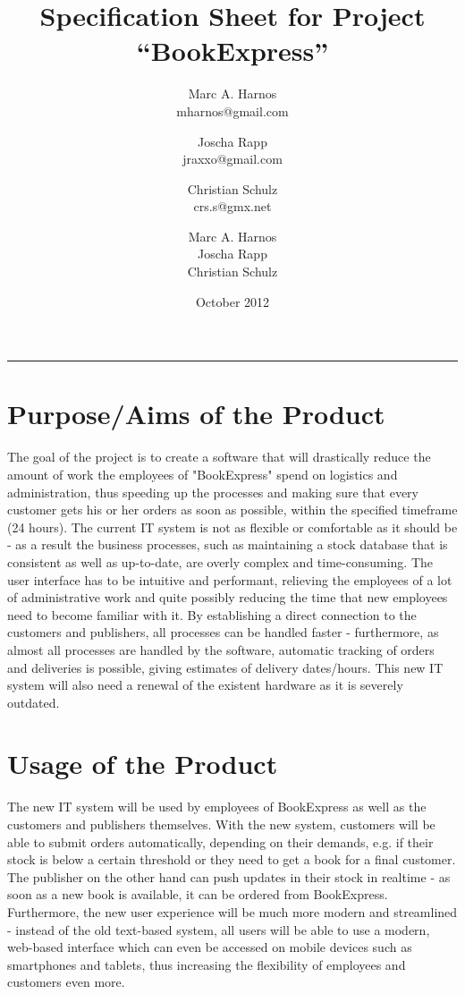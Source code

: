 \documentclass[11pt,a4paper,oneside,svgnames]{report}
\title{Specification Sheet for Project ``BookExpress''}
\author{Marc A. Harnos\\ {mharnos@gmail.com} \and Joscha Rapp\\ {jraxxo@gmail.com} \and Christian Schulz\\ {crs.s@gmx.net}}
\author{Marc A. Harnos\\ Joscha Rapp\\ Christian Schulz}
\date{October 2012}
\makeatletter
\renewcommand{\maketitle}{\begin{titlepage}%
    \let\footnotesize\small
    \let\footnoterule\relax
    \parindent \z@
    \reset@font
    \null\vfil
    \begin{flushleft}
      \huge \@title
    \end{flushleft}
    \par
    \hrule height 4pt
    \par
    \begin{flushright}
      \LARGE \@author \par
    \end{flushright}
    \vskip 60\p@
    \vfil\null
  \end{titlepage}%
  \setcounter{footnote}{0}%
}
\makeatother
\begin{document}
\maketitle
\clearpage
\tableofcontents
\clearpage

\chapter{Purpose/Aims of the Product}
The goal of the project is to create a software that will drastically reduce the amount of work the employees of "BookExpress" spend on logistics and administration, thus speeding up the processes and making sure that every customer gets his or her orders as soon as possible, within the specified timeframe (24 hours). The current IT system is not as flexible or comfortable as it should be - as a result the business processes, such as maintaining a stock database that is consistent as well as up-to-date, are overly complex and time-consuming. The user interface has to be intuitive and performant, relieving the employees of a lot of administrative work and quite possibly reducing the time that new employees need to become familiar with it. By establishing a direct connection to the customers and publishers, all processes can be handled faster - furthermore, as almost all processes are handled by the software, automatic tracking of orders and deliveries is possible, giving estimates of delivery dates/hours. This new IT system will also need a renewal of the existent hardware as it is severely outdated. 
\\
\chapter{Usage of the Product}
The new IT system will be used by employees of BookExpress as well as the customers and publishers themselves. With the new system, customers will be able to submit orders automatically, depending on their demands, e.g. if their stock is below a certain threshold or they need to get a book for a final customer. The publisher on the other hand can push updates in their stock in realtime - as soon as a new book is available, it can be ordered from BookExpress. Furthermore, the new user experience will be much more modern and streamlined - instead of the old text-based system, all users will be able to use a modern, web-based interface which can even be accessed on mobile devices such as smartphones and tablets, thus increasing the flexibility of employees and customers even more.
\\
\clearpage
\end{document}

